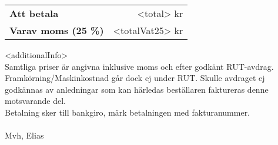 \documentclass[a4paper,11pt]{extarticle}
\newcommand{\changefont}{%
        \fontsize{9}{11}\selectfont
    }
\begin{document}
\vfill
\begin{tabularx}{\linewidth}{Xr}
\hline
    \textbf{Att betala} & <total> kr \\
    \textbf{Varav moms (25 \%)} & <totalVat25> kr \\
\hline
\end{tabularx}

\renewcommand\arraystretch{1}

\vspace{2em}
<additionalInfo> \\

Samtliga priser är angivna inklusive moms och efter godkänt RUT-avdrag. Framkörning/Maskinkostnad går dock ej under RUT. Skulle avdraget ej godkännas av anledningar som kan härledas beställaren faktureras denne motsvarande del. \\

Betalning sker till bankgiro, märk betalningen med fakturanummer. \\
~\\

Mvh, Elias

\end{document}
